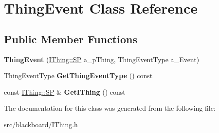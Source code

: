 \hypertarget{class_thing_event}{}\section{Thing\+Event Class Reference}
\label{class_thing_event}
\subsection*{Public Member Functions}
\begin{DoxyCompactItemize}
\item 
\mbox{\label{class_thing_event_a96489da0f4fb8dd4aade2e276ba0e027}} 
{\bfseries Thing\+Event} (\hyperlink{class_i_thing_a6e95654aef6362c48b9a2fd44a1f970a}{I\+Thing\+::\+SP} a\+\_\+p\+Thing, Thing\+Event\+Type a\+\_\+\+Event)
\item 
\mbox{\label{class_thing_event_aee687c91ea5b83c65afa32269381e1c4}} 
Thing\+Event\+Type {\bfseries Get\+Thing\+Event\+Type} () const
\item 
\mbox{\label{class_thing_event_acde379ce2354e9213fd42e3b9e506fee}} 
const \hyperlink{class_i_thing_a6e95654aef6362c48b9a2fd44a1f970a}{I\+Thing\+::\+SP} \& {\bfseries Get\+I\+Thing} () const
\end{DoxyCompactItemize}


The documentation for this class was generated from the following file\+:\begin{DoxyCompactItemize}
\item 
src/blackboard/I\+Thing.\+h\end{DoxyCompactItemize}
